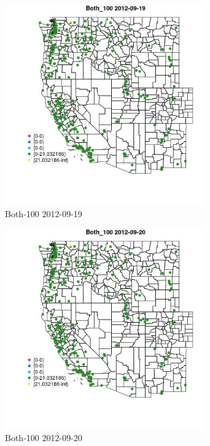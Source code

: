 \clearpage 

\begin{figure} 
\centering  
\includegraphics[width=0.77\textwidth]{Code_Outputs/ML_input_report_ML_input_PM25_Step5_part_d_de_duplicated_aves_ML_input_MapObsBoth_1002012-09-19.jpg} 
\caption{\label{fig:ML_input_report_ML_input_PM25_Step5_part_d_de_duplicated_aves_ML_inputMapObsBoth_1002012-09-19}Both-100 2012-09-19} 
\end{figure} 
 

\begin{figure} 
\centering  
\includegraphics[width=0.77\textwidth]{Code_Outputs/ML_input_report_ML_input_PM25_Step5_part_d_de_duplicated_aves_ML_input_MapObsBoth_1002012-09-20.jpg} 
\caption{\label{fig:ML_input_report_ML_input_PM25_Step5_part_d_de_duplicated_aves_ML_inputMapObsBoth_1002012-09-20}Both-100 2012-09-20} 
\end{figure} 
 


